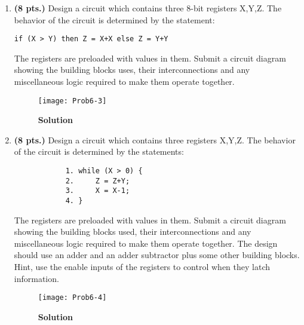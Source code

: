 \begin{enumerate}
        \ifshowanswers\needspace{2in}\fi %
    \item \textbf{ (8 pts.)} Design a circuit which contains three 8-bit
        registers X,Y,Z.  The behavior of the circuit is determined by the statement:
\begin{verbatim}
if (X > Y) then Z = X+X else Z = Y+Y
\end{verbatim}
        The registers are preloaded with values in them.
        Submit a circuit diagram showing the building blocks uses,
        their interconnections and any miscellaneous logic required to make
        them operate together.
        \begin{onlysolution} \needspace{2.58in} \itshape{
                \begin{figure}[ht]
                    \caption{\textbf{Solution}}
                    \texttt{[image: Prob6-3]}
                \end{figure}
            }
        \end{onlysolution}

        \ifshowanswers\needspace{2in}\fi
    \item \textbf{ (8 pts.)} Design a circuit which contains three registers X,Y,Z.
        The behavior of the circuit is determined by the statements:
        \begin{verbatim}
            1. while (X > 0) {
            2.     Z = Z+Y;
            3.     X = X-1;
            4. }
        \end{verbatim}
        \vspace{-1.25em}
        The registers are preloaded with values in them.
        Submit a circuit diagram showing the building blocks used,
        their interconnections and any miscellaneous logic required to make
        them operate together.  The design should use an adder and an
        adder subtractor plus some other building blocks.  Hint, use
        the enable inputs of the registers to control when they
        latch information.

        \begin{onlysolution} \itshape{
                \begin{figure}[ht]
                    \caption{\textbf{Solution}}
                    \texttt{[image: Prob6-4]}
                \end{figure}
            }
        \end{onlysolution}


\end{enumerate}
